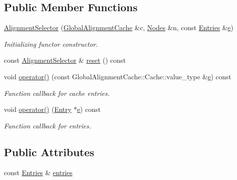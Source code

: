 \subsection*{Public Member Functions}
\begin{DoxyCompactItemize}
\item 
\hyperlink{class_d_d4hep_1_1_alignments_1_1_alignment_selector_a00da94ed989a3b504636f2c22ad6641e}{Alignment\+Selector} (\hyperlink{class_d_d4hep_1_1_alignments_1_1_global_alignment_cache}{Global\+Alignment\+Cache} \&c, \hyperlink{class_d_d4hep_1_1_alignments_1_1_alignment_operator_a2f25eae1d38abc30a09f7a840ab0662a}{Nodes} \&n, const \hyperlink{class_d_d4hep_1_1_alignments_1_1_alignment_operator_ada83b10531c5774c75f6e8c224f55f4c}{Entries} \&\hyperlink{_volumes_8cpp_a8a9a1f93e9b09afccaec215310e64142}{e})
\begin{DoxyCompactList}\small\item\em Initializing functor constructor. \end{DoxyCompactList}\item 
const \hyperlink{class_d_d4hep_1_1_alignments_1_1_alignment_selector}{Alignment\+Selector} \& \hyperlink{class_d_d4hep_1_1_alignments_1_1_alignment_selector_a590a034cc176ad7c2168d69c88af97f1}{reset} () const
\item 
void \hyperlink{class_d_d4hep_1_1_alignments_1_1_alignment_selector_ab44d5f2228dff37fa3221f6f74217737}{operator()} (const Global\+Alignment\+Cache\+::\+Cache\+::value\+\_\+type \&\hyperlink{_volumes_8cpp_a8a9a1f93e9b09afccaec215310e64142}{e}) const
\begin{DoxyCompactList}\small\item\em Function callback for cache entries. \end{DoxyCompactList}\item 
void \hyperlink{class_d_d4hep_1_1_alignments_1_1_alignment_selector_a6ea1e4e33b248c3e5a76389bedb28976}{operator()} (\hyperlink{class_d_d4hep_1_1_alignments_1_1_alignment_operator_a0dc91b46151c3685f152574147339899}{Entry} $\ast$\hyperlink{_volumes_8cpp_a8a9a1f93e9b09afccaec215310e64142}{e}) const
\begin{DoxyCompactList}\small\item\em Function callback for entries. \end{DoxyCompactList}\end{DoxyCompactItemize}
\subsection*{Public Attributes}
\begin{DoxyCompactItemize}
\item 
const \hyperlink{class_d_d4hep_1_1_alignments_1_1_alignment_operator_ada83b10531c5774c75f6e8c224f55f4c}{Entries} \& \hyperlink{class_d_d4hep_1_1_alignments_1_1_alignment_selector_ab948717c701b7aff5c744f8624cf8473}{entries}
\end{DoxyCompactItemize}
